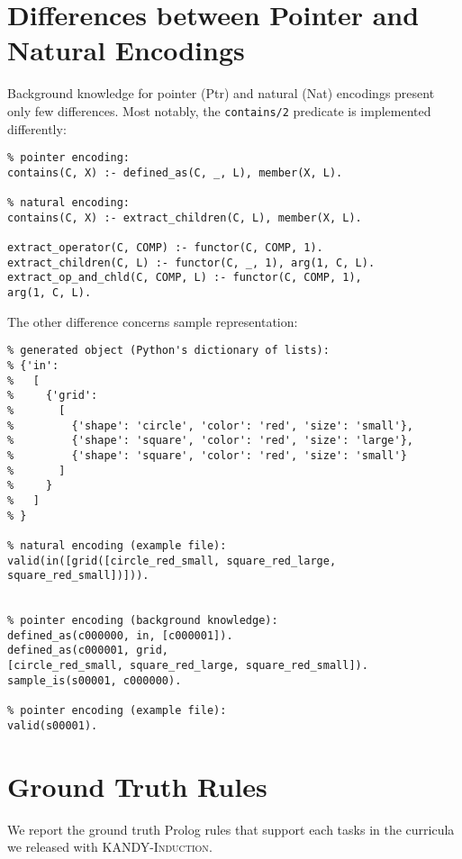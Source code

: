 \section{Differences between Pointer and Natural Encodings}
Background knowledge for pointer ({\sc\small Ptr}) and natural ({\sc\small Nat}) encodings  present only few differences. Most notably, the \texttt{contains/2} predicate is implemented differently:
$\ $\\

\begin{verbatim}
% pointer encoding:
contains(C, X) :- defined_as(C, _, L), member(X, L).

% natural encoding:
contains(C, X) :- extract_children(C, L), member(X, L).

extract_operator(C, COMP) :- functor(C, COMP, 1).
extract_children(C, L) :- functor(C, _, 1), arg(1, C, L).
extract_op_and_chld(C, COMP, L) :- functor(C, COMP, 1), 
arg(1, C, L).
\end{verbatim}
$\ $\\

\noindent The other difference concerns sample representation:
$\ $\\
\begin{verbatim}
% generated object (Python's dictionary of lists):
% {'in': 
%   [
%     {'grid': 
%       [
%         {'shape': 'circle', 'color': 'red', 'size': 'small'}, 
%         {'shape': 'square', 'color': 'red', 'size': 'large'},
%         {'shape': 'square', 'color': 'red', 'size': 'small'}
%       ]
%     }
%   ]
% }
	
% natural encoding (example file):
valid(in([grid([circle_red_small, square_red_large, square_red_small])])).


% pointer encoding (background knowledge):
defined_as(c000000, in, [c000001]).
defined_as(c000001, grid, 
[circle_red_small, square_red_large, square_red_small]).
sample_is(s00001, c000000).

% pointer encoding (example file):
valid(s00001).
\end{verbatim}

\section{Ground Truth Rules}\label{app:kandyalephgt}
We report the ground truth Prolog rules that support each tasks in the curricula we released with \textsc{KANDY-Induction}.

